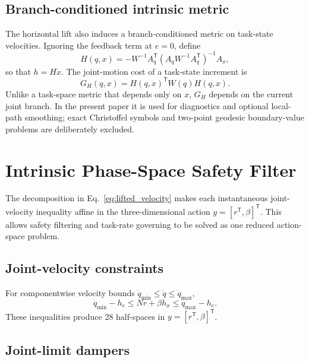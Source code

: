 \documentclass[preprint,12pt]{elsarticle}
\newcommand{\T}{^{\mathsf T}}
\begin{document}
\subsection{Branch-conditioned intrinsic metric}

The horizontal lift also induces a branch-conditioned metric on task-state velocities. Ignoring the feedback term at $e=0$, define
\begin{equation}
H(q,x)
=
-W^{-1}A_q\T
\left(A_qW^{-1}A_q\T\right)^{-1}A_x,
\label{eq:horizontal_map}
\end{equation}
so that $h=H\dot x$. The joint-motion cost of a task-state increment is
\begin{equation}
G_H(q,x)=H(q,x)\T W(q)H(q,x).
\label{eq:branch_metric}
\end{equation}
Unlike a task-space metric that depends only on $x$, $G_H$ depends on the current joint branch. In the present paper it is used for diagnostics and optional local-path smoothing; exact Christoffel symbols and two-point geodesic boundary-value problems are deliberately excluded.

\section{Intrinsic Phase-Space Safety Filter}
\label{sec:safety}

The decomposition in Eq.~\eqref{eq:lifted_velocity} makes each instantaneous joint-velocity inequality affine in the three-dimensional action $y=[r\T,\beta]\T$. This allows safety filtering and task-rate governing to be solved as one reduced action-space problem.

\subsection{Joint-velocity constraints}

For componentwise velocity bounds $\dot q_{\min}\leq\dot q\leq\dot q_{\max}$,
\begin{equation}
\dot q_{\min}-h_e\leq Nr+\beta h_x\leq\dot q_{\max}-h_e.
\label{eq:velocity_bounds}
\end{equation}
These inequalities produce 28 half-spaces in $y=[r\T,\beta]\T$.

\subsection{Joint-limit dampers}
\end{document}
